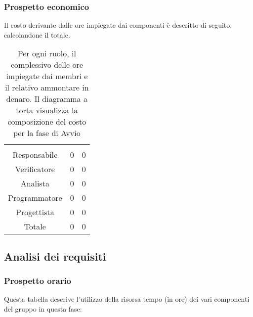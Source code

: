 \subsubsection{Prospetto economico}
Il costo derivante dalle ore impiegate dai componenti è descritto di seguito, calcolandone il totale.

\begin{table}[hbt!]
{\setlength{\parindent}{0cm}
\begin{minipage}{.43\textwidth}
	\begin{tabular}{ccc}
	\rowcolorhead
	\headertitle{Ruolo} & \headertitle{Ore} & \headertitle{Costo(€)}\\
	Responsabile & 0 & 0\\
	Verificatore & 0 & 0\\
	Analista & 0 & 0\\
	Programmatore & 0 & 0\\
	Progettista & 0 & 0\\
	\hline
	Totale & 0& 0\\
	\end{tabular}
\end{minipage}%
\begin{minipage}{.57\textwidth}
\end{minipage} }
\caption{Per ogni ruolo, il complessivo delle ore impiegate dai membri e il relativo ammontare in denaro. Il diagramma a torta visualizza la composizione del costo per la fase di Avvio}
\end{table}



\subsection{Analisi dei requisiti}

\subsubsection{Prospetto orario}
Questa tabella descrive l'utilizzo della risorsa tempo (in ore) dei vari componenti del gruppo in questa fase: \\

